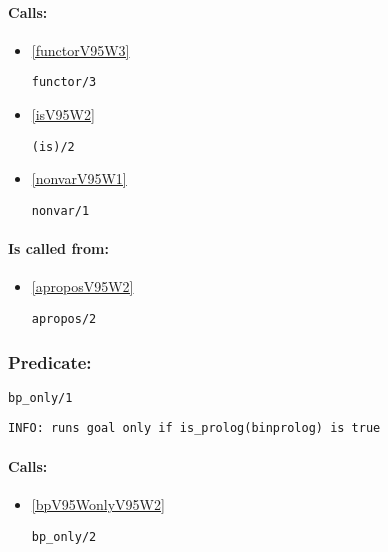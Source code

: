 \paragraph{Calls:} 
\begin{itemize}
\item \ref{functorV95W3} 
\begin{verbatim}
functor/3
\end{verbatim}

\item \ref{isV95W2} 
\begin{verbatim}
(is)/2
\end{verbatim}

\item \ref{nonvarV95W1} 
\begin{verbatim}
nonvar/1
\end{verbatim}

\end{itemize}
\paragraph{Is called from:} 
\begin{itemize}
\item \ref{aproposV95W2} 
\begin{verbatim}
apropos/2
\end{verbatim}

\end{itemize}

\subsubsection{Predicate:} \label{bpV95WonlyV95W1}

\begin{verbatim}
bp_only/1
\end{verbatim}

{\small \begin{verbatim}
INFO: runs goal only if is_prolog(binprolog) is true

\end{verbatim}}
\paragraph{Calls:} 
\begin{itemize}
\item \ref{bpV95WonlyV95W2} 
\begin{verbatim}
bp_only/2
\end{verbatim}

\end{itemize}

